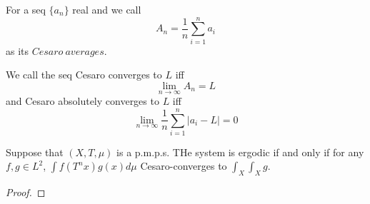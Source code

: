 \documentclass[lang=en, color=blue, ]{elegantbook}
\begin{document}
\newpage

\begin{definition}
    For a seq $\{a_n\}$ real and we call
    \[A_n = \dfrac{1}{n}\sum\limits_{i=1}^n a_i\]
    as its $Cesaro\ averages$.\par
    We call the seq Cesaro converges to $L$ iff
    \[\lim_{n\to\infty} A_n = L\]
    and Cesaro absolutely converges to $L$ iff
    \[
    \lim_{n\to\infty} \dfrac{1}{n}\sum\limits_{i=1}^n |a_i - L| = 0    
    \]
\end{definition}

\begin{lemma}
    Suppose that $(X,T,\mu)$ is a p.m.p.s. THe system is ergodic if and only if for any $f,g \in L^2$, $\int f(T^nx)g(x)d\mu$ Cesaro-converges to $\int_X \int_X g$. 
\end{lemma}
\begin{proof}
    
\end{proof}
\end{document}
